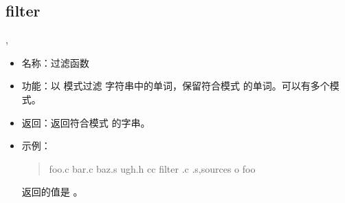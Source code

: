\documentclass[a4paper,10pt]{sphinxmanual}
\begin{document}
\subsection{filter}
\label{\detokenize{functions:filter}}
\begin{sphinxVerbatim}[commandchars=\\\{\}]
 \PYGZlt{}\PYGZgt{},\PYGZlt{}\PYGZgt{}
\end{sphinxVerbatim}
\begin{itemize}
\item {} 
名称：过滤函数

\item {} 
功能：以  模式过滤  字符串中的单词，保留符合模式
 的单词。可以有多个模式。

\item {} 
返回：返回符合模式  的字串。

\item {} 
示例：
\begin{quote}

\begin{sphinxVerbatim}[commandchars=\\\{\}]
  foo.c bar.c baz.s ugh.h
 
    cc filter \PYGZpc{}.c \PYGZpc{}.s,sources \PYGZhy{}o foo
\end{sphinxVerbatim}
\end{quote}

 返回的值是  。

\end{itemize}
\end{document}
